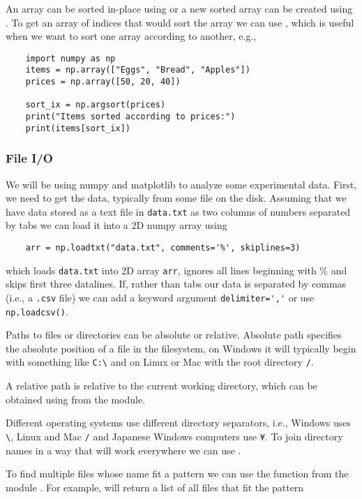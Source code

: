 An array can be sorted in-place using  or a new sorted array can be created using . To get an array of indices that would sort the array we can use , which is useful when we want to sort one array according to another, e.g.,
\begin{lstlisting}
    import numpy as np
    items = np.array(["Eggs", "Bread", "Apples"])
    prices = np.array([50, 20, 40])

    sort_ix = np.argsort(prices)
    print("Items sorted according to prices:")
    print(items[sort_ix])
\end{lstlisting}

\subsubsection{File I/O}
We will be using numpy and matplotlib to analyze some experimental data. First, we need to get the data, typically from some file on the disk. Assuming that we have data stored as a text file in \verb|data.txt| as two columns of numbers separated by tabs we can load it into a 2D numpy array using
\begin{lstlisting}
    arr = np.loadtxt("data.txt", comments='%', skiplines=3)
\end{lstlisting}
which loads \verb|data.txt| into 2D array \verb|arr|, ignores all lines beginning with \% and skips first three datalines. If, rather than tabs our data is separated by commas (i.e., a \verb|.csv| file) we can add a keyword argument \verb|delimiter=','| or use \lstinline{np.loadcsv()}.

\begin{syntax}[Paths]
    Paths to files or directories can be absolute or relative. Absolute path specifies the absolute position of a file in the filesystem, on Windows it will typically begin with something like \verb|C:\| and on Linux or Mac with the root directory \verb|/|.

    A relative path is relative to the current working directory, which can be obtained using  from the  module.

    Different operating systems use different directory separators, i.e., Windows uses \verb|\|, Linux and Mac \verb|/| and Japanese Windows computers use \verb|¥|. To join directory names in a way that will work everywhere we can use .

    To find multiple files whose name fit a pattern we can use the function  from the module . For example,  will return a list of all files that fit the pattern 
\end{syntax}

